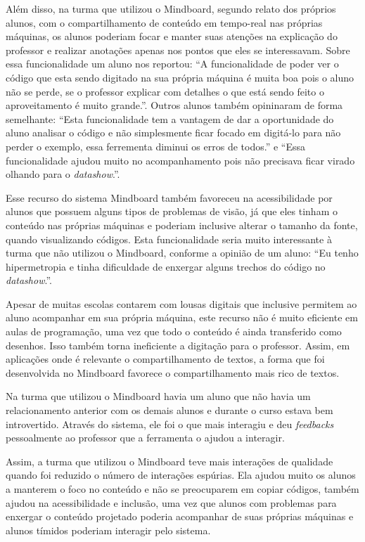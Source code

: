 Além disso, na turma que utilizou o Mindboard, segundo relato dos próprios alunos, com o compartilhamento de conteúdo em tempo-real nas próprias máquinas, os alunos poderiam focar e manter suas atenções na explicação do professor e realizar anotações apenas nos pontos que eles se interessavam. Sobre essa funcionalidade um aluno nos reportou: ``A funcionalidade de poder ver o código que esta sendo digitado na sua própria máquina é muita boa pois o aluno não se perde, se o professor explicar com detalhes o que está sendo feito o aproveitamento é muito grande.''. Outros alunos também opininaram de forma semelhante: ``Esta funcionalidade tem a vantagem de dar a oportunidade do aluno analisar o código e não simplesmente ficar focado em digitá-lo para não perder o exemplo, essa ferrementa diminui os erros de todos.'' e ``Essa funcionalidade ajudou muito no acompanhamento pois não precisava ficar virado olhando para o \emph{datashow}.''.

Esse recurso do sistema Mindboard também favoreceu na acessibilidade por alunos que possuem alguns tipos de problemas de visão, já que eles tinham o conteúdo nas próprias máquinas e poderiam inclusive alterar o tamanho da fonte, quando visualizando códigos. Esta funcionalidade seria muito interessante à turma que não utilizou o Mindboard, conforme a opinião de um aluno: ``Eu tenho hipermetropia e tinha dificuldade de enxergar alguns trechos do código no \emph{datashow}.''.

Apesar de muitas escolas contarem com lousas digitais que inclusive permitem ao aluno acompanhar em sua própria máquina, este recurso não é muito eficiente em aulas de programação, uma vez que todo o conteúdo é ainda transferido como desenhos. Isso também torna ineficiente a digitação para o professor. Assim, em aplicações onde é relevante o compartilhamento de textos, a forma que foi desenvolvida no Mindboard favorece o compartilhamento mais rico de textos.


Na turma que utilizou o Mindboard havia um aluno que não havia um relacionamento anterior com os demais alunos e durante o curso estava bem introvertido. Através do sistema, ele foi o que mais interagiu e deu \emph{feedbacks} pessoalmente ao professor que a ferramenta o ajudou a interagir.

Assim, a turma que utilizou o Mindboard teve mais interações de qualidade quando foi reduzido o número de interações espúrias. Ela ajudou muito os alunos a manterem o foco no conteúdo e não se preocuparem em copiar códigos, também ajudou na acessibilidade e inclusão, uma vez que alunos com problemas para enxergar o conteúdo projetado poderia acompanhar de suas próprias máquinas e alunos tímidos poderiam interagir pelo sistema.

